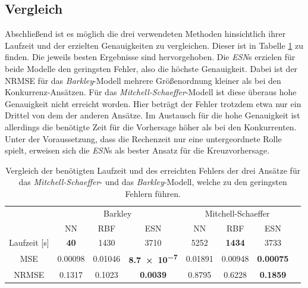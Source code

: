 \FloatBarrier
\subsection{Vergleich}
Abschließend ist es möglich die drei verwendeten Methoden hinsichtlich ihrer Laufzeit und der erzielten Genauigkeiten zu vergleichen. Dieser ist in Tabelle \ref{tab:exp_cross_comparison_results} zu finden. Die jeweils  besten Ergebnisse sind hervorgehoben. Die \textit{ESN}s erzielen für beide Modelle den geringsten Fehler, also die höchste Genauigkeit. Dabei ist der NRMSE für das \textit{Barkley}-Modell mehrere Größenordnung kleiner als bei den Konkurrenz-Ansätzen. Für das \textit{Mitchell-Schaeffer}-Modell ist diese überaus hohe Genauigkeit nicht erreicht worden. Hier beträgt der Fehler trotzdem etwa nur ein Drittel von dem der anderen Ansätze. Im Austausch für die hohe Genauigkeit ist allerdings die benötigte Zeit für die Vorhersage höher als bei den Konkurrenten. Unter der Voraussetzung, dass die Rechenzeit nur eine untergeordnete Rolle spielt, erweisen sich die \textit{ESN}s als bester Ansatz für die Kreuzvorhersage.
\begin{table}[h]
	\centering
	\captionsetup{width=0.9\linewidth}
	\begin{tabular}{cccccccc}
		\hline		
		\multicolumn{1}{c}{} & \multicolumn{3}{c}{Barkley} & \multicolumn{3}{c}{Mitchell-Schaeffer}		\\
		\multicolumn{1}{c}{} & NN & RBF & ESN & NN & RBF & ESN \\
		
		\hline
		
		Laufzeit [s] 	& \textbf{40} 		& 1430		& 3710		& 5252		& \textbf{1434} 		& 3733 \\
		MSE 			& 0.00098	& 0.01046	& \textbf{\num{8.7e-7}} 	& 0.01891	& 0.00948 	& \textbf{0.00075} \\
		NRMSE 			& 0.1317	& 0.1023	& \textbf{\num{0.0039}} 	& 0.8795	& 0.6228 	& \textbf{0.1859} \\
		\hline 
	\end{tabular} 
	\caption{Vergleich der benötigten Laufzeit und des erreichten Fehlers der drei Ansätze für das \textit{Mitchell-Schaeffer}- und das \textit{Barkley}-Modell, welche zu den geringsten Fehlern führen.}
	\label{tab:exp_cross_comparison_results}
\end{table}

\FloatBarrier